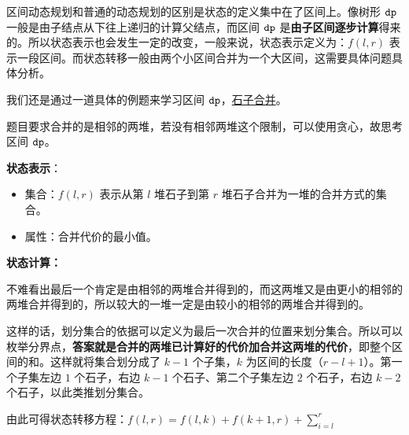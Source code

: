 
区间动态规划和普通的动态规划的区别是状态的定义集中在了区间上。像树形 $\tt dp$ 一般是由子结点从下往上递归的计算父结点，而区间 $\tt dp$ 是\textbf{由子区间逐步计算}得来的。所以状态表示也会发生一定的改变，一般来说，状态表示定义为：$f(l, r)$ 表示一段区间。而状态转移一般由两个小区间合并为一个大区间，这需要具体问题具体分析。

我们还是通过一道具体的例题来学习区间 $\tt dp$，\href{https://www.luogu.com.cn/problem/P1775}{石子合并}。

题目要求合并的是相邻的两堆，若没有相邻两堆这个限制，可以使用贪心，故思考区间 $\tt dp$。

\textbf{状态表示}：
\begin{itemize}
\item 集合：$f(l, r)$ 表示从第 $l$ 堆石子到第 $r$ 堆石子合并为一堆的合并方式的集合。
\item 属性：合并代价的最小值。
\end{itemize}

\textbf{状态计算：}

不难看出最后一个肯定是由相邻的两堆合并得到的，而这两堆又是由更小的相邻的两堆合并得到的，所以较大的一堆一定是由较小的相邻的两堆合并得到的。

这样的话，划分集合的依据可以定义为最后一次合并的位置来划分集合。所以可以枚举分界点，\textbf{答案就是合并的两堆已计算好的代价加合并这两堆的代价}，即整个区间的和。这样就将集合划分成了 $k - 1$ 个子集，$k$ 为区间的长度（$r - l + 1$）。第一个子集左边 $1$ 个石子，右边 $k - 1$ 个石子、第二个子集左边 $2$ 个石子，右边 $k - 2$ 个石子，以此类推划分集合。

由此可得状态转移方程：$f(l, r) = f(l, k) + f(k + 1, r) + \sum^{r}_{i = l}$
